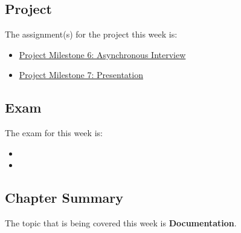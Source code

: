 \subsection{Project}

The assignment(s) for the project this week is:

\begin{itemize}
    \item \href{https://applied.cs.colorado.edu/mod/assign/view.php?id=61462}{Project Milestone 6: Asynchronous Interview}
    \item \href{https://applied.cs.colorado.edu/mod/scheduler/view.php?id=61556}{Project Milestone 7: Presentation}
\end{itemize}

\subsection{Exam}

The exam for this week is:

\begin{itemize}
    \item {}
    \item {}
\end{itemize}

\subsection{Chapter Summary}

The topic that is being covered this week is \textbf{Documentation}.

